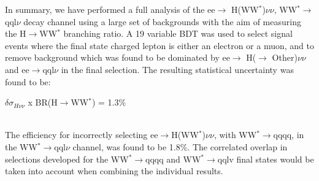 In summary, we have performed a full analysis of the ee$\rightarrow$ H(WW$^*$)$\nu\nu$, WW$^*\rightarrow$qql$\nu$ decay channel using a large set of backgrounds with the aim of measuring the H$\rightarrow$WW$^*$ branching ratio. A 19 variable BDT was used to select signal events where the final state charged lepton is either an electron or a muon, and to remove background which was found to be dominated by ee$\rightarrow$ H($\rightarrow$ Other)$\nu\nu$  and ee$\rightarrow$qql$\nu$ in the final selection. The resulting statistical uncertainty was found to be: \\[10pt]\centerline{\large{$\delta\sigma_{H\nu\nu}$ x BR(H$\rightarrow$WW$^*$) = 1.3\%}} \\[10pt] The efficiency for incorrectly selecting ee$\rightarrow$H(WW$^*$)$\nu\nu$, with WW$^*\rightarrow$qqqq, in the WW$^*\rightarrow$qql$\nu$ channel, was found to be 1.8\%. The correlated overlap in selections developed for the WW$^*\rightarrow$qqqq and WW$^*\rightarrow$qqlv final states would be taken into account when combining the individual results.
 
